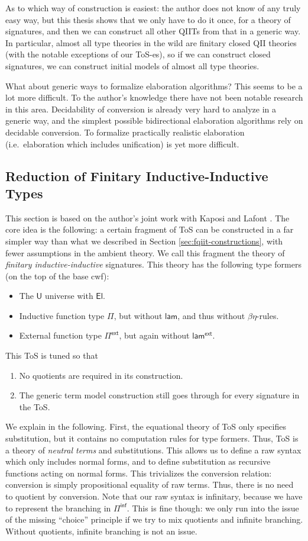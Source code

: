 \documentclass[12pt,a4paper,twoside,openany]{book}
\theoremstyle{remark}
\theoremstyle{definition}
\theoremstyle{theorem}
\newcommand{\U}{\mathsf{U}}
\newcommand{\El}{\mathsf{El}}
\newcommand{\lami}{\mathsf{lam}}
\newcommand{\Pie}{\Pi^{\mathsf{ext}}}
\newcommand{\lame}{\mathsf{lam^{ext}}}
\newcommand{\Piinf}{\Pi^{\mathsf{inf}}}
\begin{document}
As to which way of construction is easiest: the author does not know of any
truly easy way, but this thesis shows that we only have to do it once, for a
theory of signatures, and then we can construct all other QIITs from that in a
generic way. In particular, almost all type theories in the wild are finitary closed QII
theories (with the notable exceptions of our ToS-es), so if we can construct
closed signatures, we can construct initial models of almost all type theories.

What about generic ways to formalize elaboration algorithms? This seems to be a
lot more difficult. To the author's knowledge there have not been notable
research in this area. Decidability of conversion is already very hard to
analyze in a generic way, and the simplest possible bidirectional elaboration
algorithms rely on decidable conversion. To formalize practically realistic
elaboration (i.e.\ elaboration which includes unification) is yet more
difficult.

\subsection{Reduction of Finitary Inductive-Inductive Types}

This section is based on the author's joint work with Kaposi and Lafont
\cite{ind-ind-reduction}. The core idea is the following: a certain fragment of
ToS can be constructed in a far simpler way than what we described in Section
\ref{sec:fqiit-constructions}, with fewer assumptions in the ambient theory.  We
call this fragment the theory of \emph{finitary inductive-inductive} signatures.
This theory has the following type formers (on the top of the base cwf):
\begin{itemize}
  \item The $\U$ universe with $\El$.
  \item Inductive function type $\Pi$, but without $\lami$, and thus without $\beta\eta$-rules.
  \item External function type $\Pie$, but again without $\lame$.
\end{itemize}
This ToS is tuned so that
\begin{enumerate}
  \item No quotients are required in its construction.
  \item The generic term model construction still goes through for every signature in
        the ToS.
\end{enumerate}
We explain in the following. First, the equational theory of ToS only specifies
substitution, but it contains no computation rules for type formers. Thus, ToS
is a theory of \emph{neutral terms} and substitutions. This allows us to define
a raw syntax which only includes normal forms, and to define substitution as
recursive functions acting on normal forms. This trivializes the conversion
relation: conversion is simply propositional equality of raw terms. Thus, there
is no need to quotient by conversion. Note that our raw syntax is infinitary,
because we have to represent the branching in $\Piinf$. This is fine though: we
only run into the issue of the missing ``choice'' principle if we try to mix
quotients and infinite branching. Without quotients, infinite branching is not
an issue.
\end{document}
